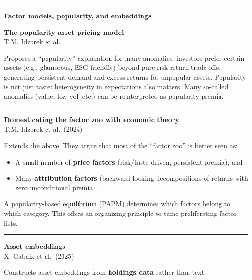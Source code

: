 \documentclass[a5paper]{article}
\providecommand{\tightlist}{%
  \setlength{\itemsep}{0pt}\setlength{\parskip}{0pt}}
\def\subsection#1{{\par\bigskip\goodbreak\large\bfseries #1\par}}
\begin{document}
\begin{center}\rule{0.5\linewidth}{0.5pt}\end{center}

\subsection{Factor models, popularity, and
embeddings}\label{factor-models-popularity-and-embeddings}

\textbf{The popularity asset pricing model}\\
T.M. Idzorek et al.

Proposes a ``popularity'' explanation for many anomalies: investors
prefer certain assets (e.g., glamorous, ESG-friendly) beyond pure
risk-return trade-offs, generating persistent demand and excess returns
for unpopular assets. Popularity is not just taste: heterogeneity in
expectations also matters. Many so-called anomalies (value, low-vol,
etc.) can be reinterpreted as popularity premia.

\begin{center}\rule{0.5\linewidth}{0.5pt}\end{center}

\textbf{Domesticating the factor zoo with economic theory}\\
T.M. Idzorek et al.~(2024)

Extends the above. They argue that most of the ``factor zoo'' is better
seen as:

\begin{itemize}
\tightlist
\item
  A small number of \textbf{price factors} (risk/taste-driven,
  persistent premia), and
\item
  Many \textbf{attribution factors} (backward-looking decompositions of
  returns with zero unconditional premia).
\end{itemize}

A popularity-based equilibrium (PAPM) determines which factors belong to
which category. This offers an organizing principle to tame
proliferating factor lists.

\begin{center}\rule{0.5\linewidth}{0.5pt}\end{center}

\textbf{Asset embeddings}\\
X. Gabaix et al.~(2025)

Constructs asset embeddings from \textbf{holdings data} rather than
text:
\end{document}
